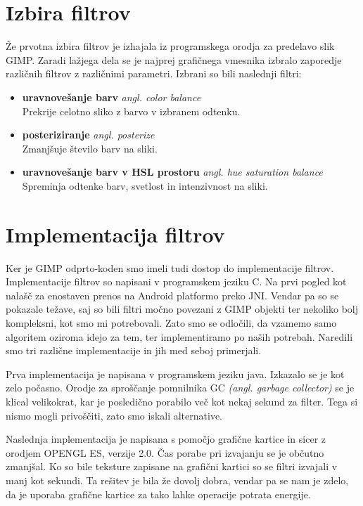 \section{Izbira filtrov}
Že prvotna izbira filtrov je izhajala iz programskega orodja za predelavo slik
GIMP. Zaradi lažjega dela se je najprej grafičnega vmesnika izbralo zaporedje
različnih filtrov z različnimi parametri. Izbrani so bili naslednji filtri:
\begin{itemize}
    \item \textbf{uravnovešanje barv} \textit{angl. color balance} \hfill \\
        Prekrije celotno sliko z barvo v izbranem odtenku.
    \item \textbf{posteriziranje} \textit{angl. posterize} \hfill \\
        Zmanjšuje število barv na sliki.
    \item \textbf{uravnovešanje barv v HSL prostoru} \textit{angl. hue saturation balance} \hfill \\
        Spreminja odtenke barv, svetlost in intenzivnost na sliki.
\end{itemize}


\section{Implementacija filtrov}
Ker je GIMP odprto-koden smo imeli tudi dostop do implementacije filtrov.
Implementacije filtrov so napisani v programskem jeziku C. Na prvi pogled kot
nalašč za enostaven prenos na Android platformo preko JNI. Vendar pa so se
pokazale težave, saj so bili filtri močno povezani z GIMP objekti ter nekoliko
bolj kompleksni, kot smo mi potrebovali. Zato smo se odločili, da vzamemo samo
algoritem oziroma idejo za tem, ter implementiramo po naših potrebah. Naredili
smo tri različne implementacije in jih med seboj primerjali.

Prva implementacija je napisana v programskem jeziku java. Izkazalo se je kot
zelo počasno. Orodje za sproščanje pomnilnika GC \textit{(angl. garbage
collector)} se je klical velikokrat, kar je posledično porabilo več kot nekaj
sekund za filter. Tega si nismo mogli privoščiti, zato smo iskali alternative.

Naslednja implementacija je napisana s pomočjo grafične kartice in sicer z
orodjem OPENGL ES, verzije 2.0. Čas porabe pri izvajanju se je občutno
zmanjšal. Ko so bile teksture zapisane na grafični kartici so se filtri
izvajali v manj kot sekundi. Ta rešitev je bila že dovolj dobra, vendar pa se
nam je zdelo, da je uporaba grafične kartice za tako lahke operacije potrata
energije.

